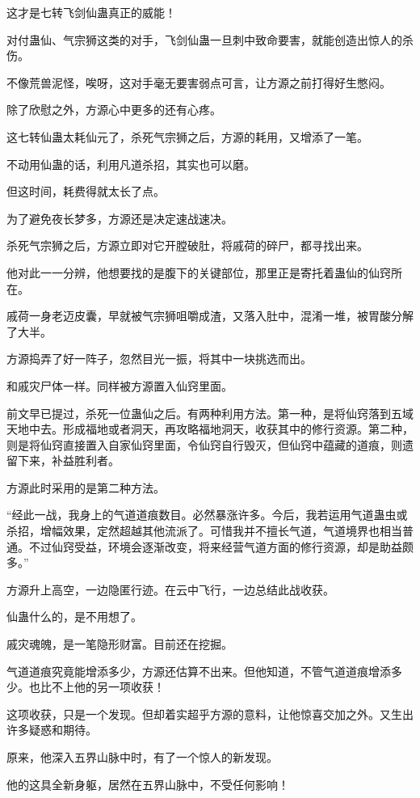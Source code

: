 \begin{this_body}
这才是七转飞剑仙蛊真正的威能！

对付蛊仙、气宗狮这类的对手，飞剑仙蛊一旦刺中致命要害，就能创造出惊人的杀伤。

不像荒兽泥怪，唉呀，这对手毫无要害弱点可言，让方源之前打得好生憋闷。

除了欣慰之外，方源心中更多的还有心疼。

这七转仙蛊太耗仙元了，杀死气宗狮之后，方源的耗用，又增添了一笔。

不动用仙蛊的话，利用凡道杀招，其实也可以磨。

但这时间，耗费得就太长了点。

为了避免夜长梦多，方源还是决定速战速决。

杀死气宗狮之后，方源立即对它开膛破肚，将戚荷的碎尸，都寻找出来。

他对此一一分辨，他想要找的是腹下的关键部位，那里正是寄托着蛊仙的仙窍所在。

戚荷一身老迈皮囊，早就被气宗狮咀嚼成渣，又落入肚中，混淆一堆，被胃酸分解了大半。

方源捣弄了好一阵子，忽然目光一振，将其中一块挑选而出。

和戚灾尸体一样。同样被方源置入仙窍里面。

前文早已提过，杀死一位蛊仙之后。有两种利用方法。第一种，是将仙窍落到五域天地中去。形成福地或者洞天，再攻略福地洞天，收获其中的修行资源。第二种，则是将仙窍直接置入自家仙窍里面，令仙窍自行毁灭，但仙窍中蕴藏的道痕，则遗留下来，补益胜利者。

方源此时采用的是第二种方法。

“经此一战，我身上的气道道痕数目。必然暴涨许多。今后，我若运用气道蛊虫或杀招，增幅效果，定然超越其他流派了。可惜我并不擅长气道，气道境界也相当普通。不过仙窍受益，环境会逐渐改变，将来经营气道方面的修行资源，却是助益颇多。”

方源升上高空，一边隐匿行迹。在云中飞行，一边总结此战收获。

仙蛊什么的，是不用想了。

戚灾魂魄，是一笔隐形财富。目前还在挖掘。

气道道痕究竟能增添多少，方源还估算不出来。但他知道，不管气道道痕增添多少。也比不上他的另一项收获！

这项收获，只是一个发现。但却着实超乎方源的意料，让他惊喜交加之外。又生出许多疑惑和期待。

原来，他深入五界山脉中时，有了一个惊人的新发现。

他的这具全新身躯，居然在五界山脉中，不受任何影响！


\end{this_body}
